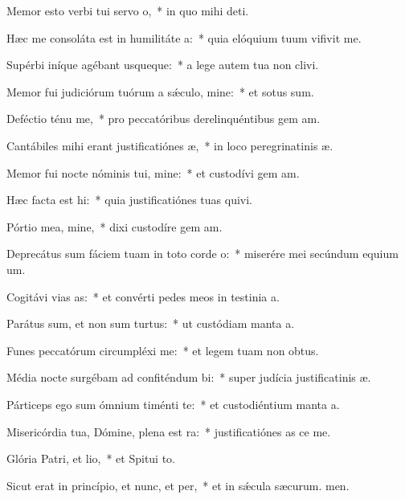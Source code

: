 \item Memor esto verbi tui servo o,~* in quo mihi  deti.
\item Hæc me consoláta est in humilitáte a:~* quia elóquium tuum vifivit me.
\item Supérbi iníque agébant usqueque:~* a lege autem tua non clivi.
\item Memor fui judiciórum tuórum a sǽculo, mine:~* et sotus sum.
\item Deféctio ténu me,~* pro peccatóribus derelinquéntibus gem am.
\item Cantábiles mihi erant justificatiónes æ,~* in loco peregrinatinis æ.
\item Memor fui nocte nóminis tui, mine:~* et custodívi gem am.
\item Hæc facta est hi:~* quia justificatiónes tuas quivi.
\item Pórtio mea, mine,~* dixi custodíre gem am.
\item Deprecátus sum fáciem tuam in toto corde o:~* miserére mei secúndum equium um.
\item Cogitávi vias as:~* et convérti pedes meos in testinia a.
\item Parátus sum, et non sum turtus:~* ut custódiam manta a.
\item Funes peccatórum circumpléxi  me:~* et legem tuam non  obtus.
\item Média nocte surgébam ad confiténdum bi:~* super judícia justificatinis æ.
\item Párticeps ego sum ómnium timénti te:~* et custodiéntium manta a.
\item Misericórdia tua, Dómine, plena est ra:~* justificatiónes as ce me.
\item Glória Patri, et lio,~* et Spitui to.
\item Sicut erat in princípio, et nunc, et per,~* et in sǽcula sæcurum. men.
